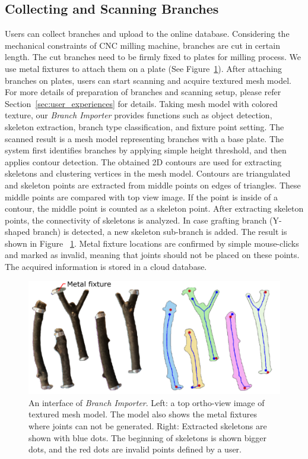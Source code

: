 \subsection{Collecting and Scanning Branches}
Users can collect branches and upload to the online database.
Considering the mechanical constraints of CNC milling machine, branches are cut in certain length.
The cut branches need to be firmly fixed to plates for milling process.
We use metal fixtures to attach them on a plate (See Figure~\ref{fig:skeleton}).
After attaching branches on plates, users can start scanning and acquire textured mesh model.
For more details of preparation of branches and scanning setup, please refer Section~\ref{sec:user_experiences} for details.
Taking mesh model with colored texture, our \textit{Branch Importer} provides functions such as object detection, skeleton extraction, branch type classification, and fixture point setting.
The scanned result is a mesh model representing branches with a base plate.
The system first identifies branches by applying simple height threshold, and then applies contour detection.
The obtained 2D contours are used for extracting skeletons and clustering vertices in the mesh model.
Contours are triangulated and skeleton points are extracted from middle points on edges of triangles.
These middle points are compared with top view image.
If the point is inside of a contour, the middle point is counted as a skeleton point.
After extracting skeleton points, the connectivity of skeletons is analyzed.
In case grafting branch (Y-shaped branch) is detected, a new skeleton sub-branch is added.
The result is shown in Figure ~\ref{fig:skeleton}.
Metal fixture locations are confirmed by simple mouse-clicks and marked as invalid, meaning that joints should not be placed on these points.
The acquired information is stored in a cloud database.

\begin{figure}[ht]
  \includegraphics[width = 0.4\paperwidth]{images/importer/importer_2.png}
  \caption{An interface of \textit{Branch Importer}. Left: a top ortho-view image of textured mesh model. The model also shows the metal fixtures where joints can not be generated. Right: Extracted skeletons are shown with blue dots. The beginning of skeletons is shown bigger dots, and the red dots are invalid points defined by a user. }
  \label{fig:skeleton}
\end{figure}


